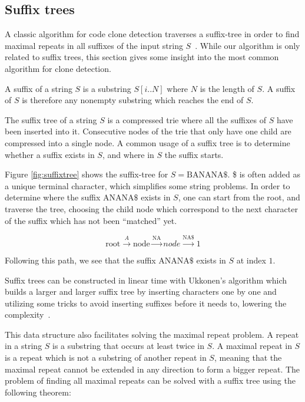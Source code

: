 \subsection*{Suffix trees}

A classic algorithm for code clone detection traverses a suffix-tree in order to find
maximal repeats in all suffixes of the input string $S$~\cite{Zibran_real_time_search,
GodeIncrementalCloneDetection}. While our algorithm is only related to suffix trees, this
section gives some insight into the most common algorithm for clone detection.

A suffix of a string $S$ is a substring $S[i..N]$ where $N$ is the length of $S$. A suffix
of $S$ is therefore any nonempty substring which reaches the end of $S$.

The suffix tree of a string $S$ is a compressed trie where all the suffixes of $S$ have
been inserted into it. Consecutive nodes of the trie that only have one child are
compressed into a single node. A common usage of a suffix tree is to determine whether a
suffix exists in $S$, and where in $S$ the suffix starts.

Figure \ref{fig:suffixtree} shows the suffix-tree for $S=\text{BANANA\$}$. \$ is often
added as a unique terminal character, which simplifies some string problems. In order to
determine where the suffix $\text{ANANA\$}$ exists in $S$, one can start from the root,
and traverse the tree, choosing the child node which correspond to the next character of
the suffix which has not been ``matched'' yet.

$$
\text{root} \xrightarrow{A} \text{node} \xrightarrow{\text{NA}} node \xrightarrow{\text{NA\$}} 1
$$

Following this path, we see that the suffix $\text{ANANA\$}$ exists in $S$ at index $1$.

Suffix trees can be constructed in linear time with Ukkonen's algorithm which builds a
larger and larger suffix tree by inserting characters one by one and utilizing some tricks
to avoid inserting suffixes before it needs to, lowering the complexity~\cite{Ukkonen}.

This data structure also facilitates solving the maximal repeat problem. A repeat in a
string $S$ is a substring that occurs at least twice in $S$. A maximal repeat in $S$ is a repeat
which is not a substring of another repeat in $S$, meaning that the maximal repeat cannot be
extended in any direction to form a bigger repeat. The problem of finding all maximal
repeats can be solved with a suffix tree using the following theorem:

